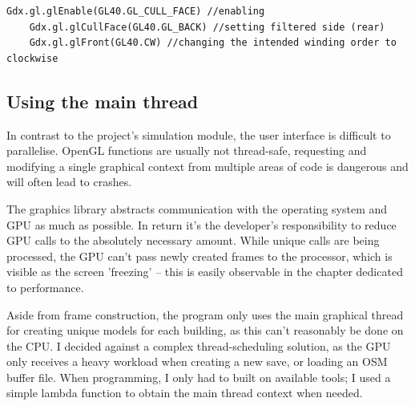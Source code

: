 \begin{lstlisting}[caption=Example for changing OpenGL's culling properties through libGDX]
    Gdx.gl.glEnable(GL40.GL_CULL_FACE) //enabling
    Gdx.gl.glCullFace(GL40.GL_BACK) //setting filtered side (rear)
    Gdx.gl.glFront(GL40.CW) //changing the intended winding order to clockwise
\end{lstlisting}

\subsection{Using the main thread}

In contrast to the project's simulation module, the user interface is difficult to parallelise. OpenGL functions are usually not thread-safe, requesting and modifying a single graphical context from multiple areas of code is dangerous and will often lead to crashes.


The graphics library abstracts communication with the operating system and GPU as much as possible. In return it's the developer's responsibility to reduce GPU calls to the absolutely necessary amount. While unique calls are being processed, the GPU can't pass newly created frames to the processor, which is visible as the screen 'freezing' -- this is easily observable in the chapter dedicated to performance. 


Aside from frame construction, the program only uses the main graphical thread for creating unique models for each building, as this can't reasonably be done on the CPU. I decided against a complex thread-scheduling solution, as the GPU  only receives a heavy workload when creating a new save, or loading an OSM buffer file. When programming, I only had to built on available tools; I used a simple lambda function to obtain the main thread context when needed.

